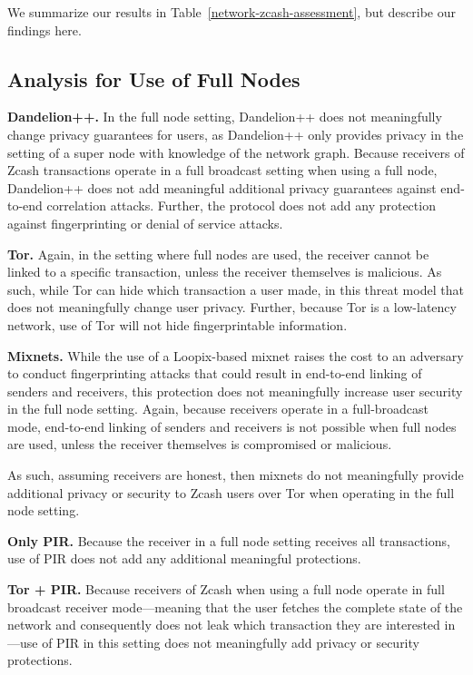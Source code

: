 \documentclass{article}
\begin{document}
We summarize our results in Table~\ref{network-zcash-assessment}, but describe
our findings here.

\subsection{Analysis for Use of Full Nodes}

\textbf{Dandelion++.}
In the full node setting, Dandelion++ does not meaningfully change privacy
guarantees for users, as Dandelion++ only provides privacy in the setting of a
super node with knowledge of the network graph. Because receivers of
Zcash transactions operate in a full broadcast setting when using a full node,
Dandelion++ does not add meaningful additional privacy guarantees against
end-to-end correlation attacks. Further, the protocol does not add any
protection against fingerprinting or denial of service attacks.

\textbf{Tor.}
Again, in the setting where full nodes are used, the receiver cannot be linked
to a specific transaction, unless the receiver themselves is malicious. As
such, while Tor can hide which transaction a user made, in this threat model
that does not meaningfully change user privacy. Further, because Tor is a
low-latency network, use of Tor will not hide fingerprintable information.

\textbf{Mixnets.}
While the use of a Loopix-based mixnet raises the cost to an adversary to
conduct fingerprinting attacks that could result in end-to-end linking of
senders and receivers, this protection does not meaningfully increase user
security in the full node setting. Again, because receivers operate in a
full-broadcast mode, end-to-end linking of senders and receivers is not
possible when full nodes are used, unless the receiver themselves is
compromised or malicious.

As such, assuming receivers are honest, then mixnets do not meaningfully provide
additional privacy or security to Zcash users over Tor when operating in the
full node setting.

\textbf{Only PIR.}
Because the receiver in a full node setting receives all transactions, use of
PIR does not add any additional meaningful protections.

\textbf{Tor + PIR.}
Because receivers of Zcash when using a full node operate in full broadcast
receiver mode---meaning that the user fetches the complete state of the network
and consequently does not leak which transaction they are interested in---use
of PIR in this setting does not meaningfully add privacy or security
protections.
\end{document}
